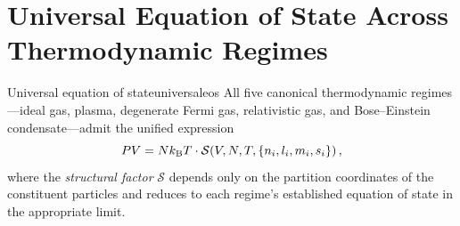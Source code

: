 \section{Universal Equation of State Across Thermodynamic Regimes}
\label{sec:universaleos}

\begin{consequence}{Universal equation of state}{universaleos}
All five canonical thermodynamic regimes---ideal gas, plasma, degenerate
Fermi gas, relativistic gas, and Bose--Einstein condensate---admit the
unified expression
\begin{equation}
  PV = Nk_{\mathrm{B}} T \cdot
    \mathcal{S}\!\left(V, N, T, \{n_i, l_i, m_i, s_i\}\right),
  \label{eq:universaleos}
\end{equation}
where the \emph{structural factor} $\mathcal{S}$ depends only on the
partition coordinates of the constituent particles and reduces to each
regime's established equation of state in the appropriate limit.
\end{consequence}

